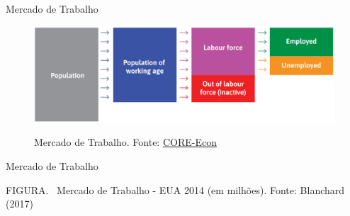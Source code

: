 \documentclass[10pt]{beamer}
\begin{document}
\begin{frame}
    {Mercado de Trabalho}
    \begin{figure}
        \centering
        \href{https://www.core-econ.org/the-economy/book/text/09.html}{\includegraphics[width=\textwidth]{./figures/aula10_fig3.PNG}}
        \caption{Mercado de Trabalho. Fonte: \href{https://www.core-econ.org/the-economy/book/text/09.html}{CORE-Econ}}
    \end{figure}
\end{frame}

\begin{frame}{Mercado de Trabalho}
    \begin{center}
		\begin{minipage}[b]{.55\textwidth}
			\tiny{{\scshape FIGURA}. \ Mercado de Trabalho - EUA 2014 (em milhões). Fonte: Blanchard (2017)} 
		\end{minipage}
	\end{center}
\end{frame}
\end{document}
